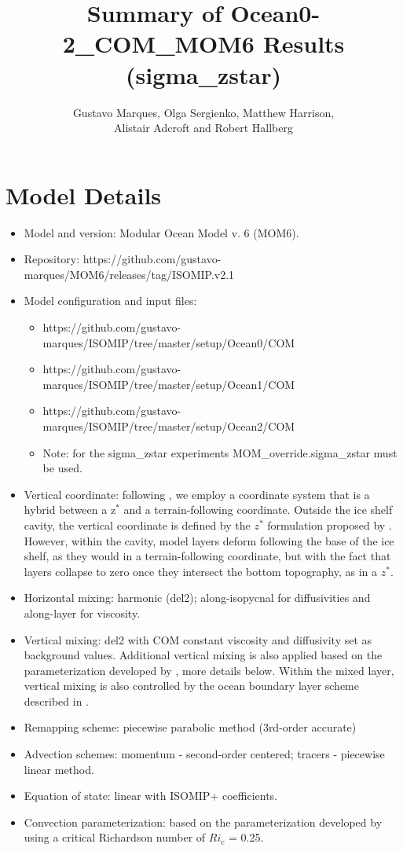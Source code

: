 \documentclass[11pt]{article} %
\title{Summary of Ocean0-2\_COM\_MOM6 Results (sigma\_zstar)}
\author{Gustavo Marques,  Olga Sergienko, Matthew Harrison, \\ Alistair Adcroft and Robert Hallberg}
\begin{document}
\maketitle

\section{Model Details}

\begin{itemize}
\item Model and version: Modular Ocean Model v. 6 (MOM6).
\item Repository: https://github.com/gustavo-marques/MOM6/releases/tag/ISOMIP.v2.1
\item Model configuration and input files:
\begin{itemize}
   \item https://github.com/gustavo-marques/ISOMIP/tree/master/setup/Ocean0/COM
   \item https://github.com/gustavo-marques/ISOMIP/tree/master/setup/Ocean1/COM
   \item https://github.com/gustavo-marques/ISOMIP/tree/master/setup/Ocean2/COM
   \item Note: for the sigma\_zstar experiments MOM\_override.sigma\_zstar must be used.
\end{itemize}
\item Vertical coordinate: following \cite{Stern2017}, we employ a coordinate system that is a hybrid between a z$^*$ and a terrain-following coordinate. Outside the ice shelf cavity, the vertical coordinate is defined by the $z^*$ formulation proposed by \cite{Adcroft2004}. However, within the cavity, model layers deform following the base of the ice shelf, as they would in a terrain-following coordinate, but with the fact that layers collapse to zero once they intersect the bottom topography, as in a $z^*$.
\item Horizontal mixing: harmonic (del2); along-isopycnal for diffusivities and along-layer for viscosity.
\item Vertical mixing: del2 with COM constant viscosity and diffusivity set as background values. Additional vertical mixing is also applied based on the parameterization developed by \cite{Jackson2008}, more details below. Within the mixed layer, vertical mixing is also controlled by the ocean boundary layer scheme described in \cite{Reichl2018}.
\item Remapping scheme: piecewise parabolic method (3rd-order accurate)
\item Advection schemes: momentum - second-order centered; tracers - piecewise linear method.
\item Equation of state: linear with ISOMIP+ coefficients.
\item Convection parameterization: based on the parameterization developed by \cite{Jackson2008} using a critical Richardson number of $Ri_c$ = 0.25.


\end{itemize}
\end{document}
